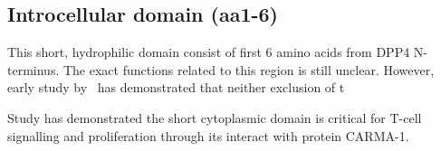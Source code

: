 \subsection{Introcellular domain (aa1-6)}

This short, hydrophilic domain consist of first 6 amino acids from DPP4 N-terminus. The exact functions related to this region is still unclear. However, early study by~\citet{Hong1990} has demonstrated that neither exclusion of t

Study has demonstrated the short cytoplasmic domain is critical for T-cell signalling and proliferation through its interact with protein CARMA-1. \cite{Ohnuma_2007}
